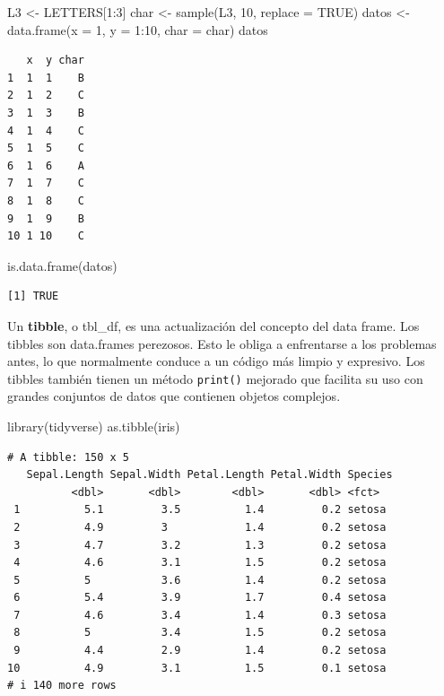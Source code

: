 \documentclass[
  letterpaper,
  DIV=11,
  numbers=noendperiod]{scrreprt}
\newenvironment{Shaded}{\begin{snugshade}}{\end{snugshade}}
\newcommand{\AttributeTok}[1]{\textcolor[rgb]{0.40,0.45,0.13}{#1}}
\newcommand{\ConstantTok}[1]{\textcolor[rgb]{0.56,0.35,0.01}{#1}}
\newcommand{\DecValTok}[1]{\textcolor[rgb]{0.68,0.00,0.00}{#1}}
\newcommand{\FunctionTok}[1]{\textcolor[rgb]{0.28,0.35,0.67}{#1}}
\newcommand{\NormalTok}[1]{\textcolor[rgb]{0.00,0.23,0.31}{#1}}
\newcommand{\OtherTok}[1]{\textcolor[rgb]{0.00,0.23,0.31}{#1}}
\newcommand{\SpecialCharTok}[1]{\textcolor[rgb]{0.37,0.37,0.37}{#1}}
\begin{document}
\begin{Shaded}
\begin{Highlighting}[]
\NormalTok{L3 }\OtherTok{\textless{}{-}}\NormalTok{ LETTERS[}\DecValTok{1}\SpecialCharTok{:}\DecValTok{3}\NormalTok{]}
\NormalTok{char }\OtherTok{\textless{}{-}} \FunctionTok{sample}\NormalTok{(L3, }\DecValTok{10}\NormalTok{, }\AttributeTok{replace =} \ConstantTok{TRUE}\NormalTok{)}
\NormalTok{datos }\OtherTok{\textless{}{-}} \FunctionTok{data.frame}\NormalTok{(}\AttributeTok{x =} \DecValTok{1}\NormalTok{, }\AttributeTok{y =} \DecValTok{1}\SpecialCharTok{:}\DecValTok{10}\NormalTok{, }\AttributeTok{char =}\NormalTok{ char)}
\NormalTok{datos}
\end{Highlighting}
\end{Shaded}

\begin{verbatim}
   x  y char
1  1  1    B
2  1  2    C
3  1  3    B
4  1  4    C
5  1  5    C
6  1  6    A
7  1  7    C
8  1  8    C
9  1  9    B
10 1 10    C
\end{verbatim}

\begin{Shaded}
\begin{Highlighting}[]
\FunctionTok{is.data.frame}\NormalTok{(datos)}
\end{Highlighting}
\end{Shaded}

\begin{verbatim}
[1] TRUE
\end{verbatim}

Un \textbf{tibble}, o tbl\_df, es una actualización del concepto del
data frame. Los tibbles son data.frames perezosos. Esto le obliga a
enfrentarse a los problemas antes, lo que normalmente conduce a un
código más limpio y expresivo. Los tibbles también tienen un método
\texttt{print()} mejorado que facilita su uso con grandes conjuntos de
datos que contienen objetos complejos.

\begin{Shaded}
\begin{Highlighting}[]
\FunctionTok{library}\NormalTok{(tidyverse)}
\FunctionTok{as.tibble}\NormalTok{(iris)}
\end{Highlighting}
\end{Shaded}

\begin{verbatim}
# A tibble: 150 x 5
   Sepal.Length Sepal.Width Petal.Length Petal.Width Species
          <dbl>       <dbl>        <dbl>       <dbl> <fct>  
 1          5.1         3.5          1.4         0.2 setosa 
 2          4.9         3            1.4         0.2 setosa 
 3          4.7         3.2          1.3         0.2 setosa 
 4          4.6         3.1          1.5         0.2 setosa 
 5          5           3.6          1.4         0.2 setosa 
 6          5.4         3.9          1.7         0.4 setosa 
 7          4.6         3.4          1.4         0.3 setosa 
 8          5           3.4          1.5         0.2 setosa 
 9          4.4         2.9          1.4         0.2 setosa 
10          4.9         3.1          1.5         0.1 setosa 
# i 140 more rows
\end{verbatim}
\end{document}
